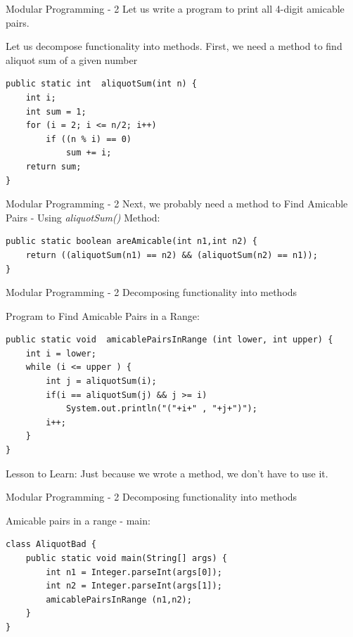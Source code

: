 \documentclass[14pt]{beamer}
\begin{document}
\begin{frame}[fragile]{Modular Programming - 2}
Let us write a program to print all 4-digit amicable pairs.

Let us decompose functionality into methods. First, we need a method to find aliquot sum of a given number
\begin{lstlisting}[numbers=none]
public static int  aliquotSum(int n) {
    int i;
    int sum = 1;
    for (i = 2; i <= n/2; i++)
        if ((n % i) == 0)
            sum += i;
    return sum;
}

\end{lstlisting}
\end{frame}

\begin{frame}[fragile]{Modular Programming - 2}
Next, we probably need a method to Find Amicable Pairs - Using \emph{aliquotSum()} Method:
\begin{lstlisting}[numbers=none]
public static boolean areAmicable(int n1,int n2) {
    return ((aliquotSum(n1) == n2) && (aliquotSum(n2) == n1));
}
\end{lstlisting}
\end{frame}

\begin{frame}[fragile]{Modular Programming - 2}
Decomposing functionality into methods

Program to Find Amicable Pairs in a Range:
\begin{lstlisting}[numbers=none]
public static void  amicablePairsInRange (int lower, int upper) {
    int i = lower;
    while (i <= upper ) {
        int j = aliquotSum(i);
        if(i == aliquotSum(j) && j >= i)
            System.out.println("("+i+" , "+j+")"); 
        i++;
    }
}
\end{lstlisting}
\begin{block}{Lesson to Learn:}
Just because we wrote a method, we don't have to use it.
\end{block}
\end{frame}

\begin{frame}[fragile]{Modular Programming - 2}
Decomposing functionality into methods
\begin{block}{Amicable pairs in a range - main:}
\begin{lstlisting}[numbers=none]
class AliquotBad {
    public static void main(String[] args) {
        int n1 = Integer.parseInt(args[0]);
        int n2 = Integer.parseInt(args[1]);
        amicablePairsInRange (n1,n2);
    }	
}
\end{lstlisting}
\end{block}
\end{frame}
\end{document}
